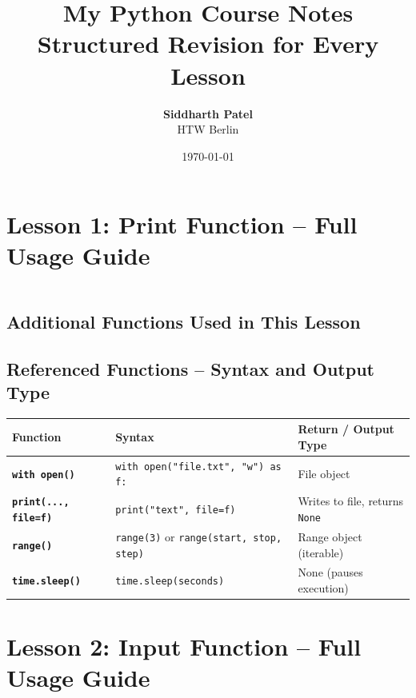 \documentclass[a4paper,11pt]{article}
\title{\Huge \textbf{My Python Course Notes}\\[1ex]
	\Large Structured Revision for Every Lesson}
\author{\textbf{Siddharth Patel} \\ HTW Berlin}
\date{\today}
\begin{document}
	
	\maketitle
	\thispagestyle{empty}
	\newpage
	\tableofcontents
	\newpage
	
	\section{Lesson 1: Print Function – Full Usage Guide}
	\inputminted{python}{Python_Files/print_guid.py}
	
	\vspace{1em}
	\subsection*{Additional Functions Used in This Lesson}
	
\vspace{1em}
\subsection*{Referenced Functions – Syntax and Output Type}

\begin{tabular}{>{\bfseries}p{4cm} p{7.5cm} p{3cm}}
	\toprule
	Function & Syntax & Return / Output Type \\
	\midrule
	
	\texttt{with open()} & \texttt{with open("file.txt", "w") as f:} & File object \\
	\texttt{print(..., file=f)} & \texttt{print("text", file=f)} & Writes to file, returns \texttt{None} \\
	
	\texttt{range()} & \texttt{range(3)} or \texttt{range(start, stop, step)} & Range object (iterable) \\
	
	\texttt{time.sleep()} & \texttt{time.sleep(seconds)} & None (pauses execution) \\
	
	\bottomrule
\end{tabular}

	
	
	\section{Lesson 2: Input Function – Full Usage Guide}
	\inputminted{python}{Python_Files/input_guid.py}
	
\end{document}
